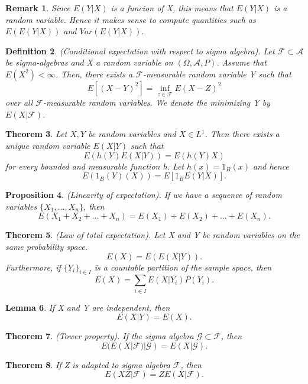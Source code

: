 \documentclass[twoside]{article}
\newcounter{lecnum}
\newtheorem{theorem}{Theorem}[lecnum]
\newtheorem{lemma}[theorem]{Lemma}
\newtheorem{proposition}[theorem]{Proposition}
\newtheorem{remark}[theorem]{Remark}
\newtheorem{definition}[theorem]{Definition}
\begin{document}
\begin{remark}Since $E(Y|X)$ is a funcion of X, this means that $E(Y|X)$ is a random variable. Hence it makes sense to compute quantities such as $E(E(Y|X))$ and $Var(E(Y|X))$.
\end{remark}

\begin{definition}(Conditional expectation with respect to sigma algebra). Let $\mathcal{F} \subset \mathcal{A}$ be sigma-algebras and X a random variable on $(\Omega, \mathcal{A}, P)$. Assume that $E(X^2) < \infty$. Then, there exists a $\mathcal{F}$-measurable random variable Y such that 
$$
E[(X-Y)^2] = \inf_{z \in \mathcal{F}}E(X-Z)^2
$$
over all $\mathcal{F}$-measurable random variables. We denote the minimizing Y by $E(X|\mathcal{F})$.
\end{definition}

\begin{theorem}Let $X, Y$ be random variables and $X \in L^1$. Then there exists a unique random variable $E(X|Y)$ such that 
$$
E(h(Y)E(X|Y)) = E(h(Y)X)
$$
for every bounded and measurable function h. Let $h(x) = 1_B(x)$ and hence 
$$
E(1_B(Y)(X)) = E[1_BE(Y|X)].
$$
\end{theorem}


\begin{proposition}(Linearity of expectation). If we have a sequence of random variables $\{X_1,...,X_n\}$, then 
$$
E(X_1 + X_2 + ... + X_n) = E(X_1) + E(X_2) + ... + E(X_n).
$$
\end{proposition}

\begin{theorem}(Law of total expectation). Let X and Y be random variables on the same probability space.
$$
E(X) = E(E(X|Y)).
$$
Furthermore, if $\{Y_i\}_{i \in I}$ is a countable partition of the sample space, then 
$$
E(X) = \sum_{i \in I}E(X|Y_i)P(Y_i).
$$
\end{theorem}

\begin{lemma}If X and Y are independent, then 
$$
E(X|Y) = E(X).
$$
\end{lemma}

\begin{theorem}(Tower property). If the sigma algebra $\mathcal{G} \subset \mathcal{F}$, then 
$$
E(E(X|\mathcal{F})|\mathcal{G}) = E(X|\mathcal{G}).
$$
\end{theorem}

\begin{theorem}If Z is adapted to sigma algebra $\mathcal{F}$, then 
$$
E(XZ|\mathcal{F}) = ZE(X|\mathcal{F}).
$$
\end{theorem}
\end{document}
